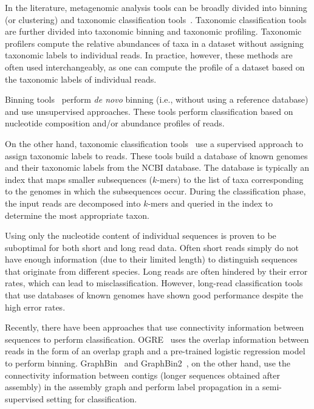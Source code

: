 In the literature, metagenomic analysis tools can be broadly divided into binning (or clustering) and taxonomic classification tools~\cite{simon2019benchmarking, maric2020benchmarking}. 
Taxonomic classification tools are further divided into taxonomic binning and taxonomic profiling. Taxonomic profilers compute the relative abundances of taxa in a dataset without assigning taxonomic labels to individual reads. In practice, however, these methods are often used interchangeably, as one can compute the profile of a dataset based on the taxonomic labels of individual reads.

Binning tools~\cite{balvert2019ogre, wickramarachchi2020metabcc, van2015two, alanko2017framework, cleary2015detection, girotto2016metaprob, luo2019metagenomic, alneberg2014binning, wu2016maxbin, sedlar2017bioinformatics, HerathTTAH17, kelley2010clustering, kang2019metabat, strous2012binning} perform \textit{de novo} binning (i.e., without using a reference database) and use unsupervised approaches. 
These tools perform classification based on nucleotide composition and/or abundance profiles of reads.

On the other hand, taxonomic classification tools~\cite{ames2013scalable, kim2016centrifuge, menzel2016fast, wood2014kraken, wood2019improved, dilthey2019strain,liu2018novel} use a supervised approach to assign taxonomic labels to reads.
These tools build a database of known genomes and their taxonomic labels from the NCBI database. 
The database is typically an index that maps smaller subsequences ($k$-mers) to the list of taxa corresponding to the genomes in which the subsequences occur. 
During the classification phase, the input reads are decomposed into $k$-mers and queried in the index to determine the most appropriate taxon.

Using only the nucleotide content of individual sequences is proven to be suboptimal for both short and long read data.
Often short reads simply do not have enough information (due to their limited length) to distinguish sequences that originate from different species.
Long reads are often hindered by their error rates, which can lead to misclassification.
However, long-read classification tools that use databases of known genomes have shown good performance despite the high error rates.

Recently, there have been approaches that use connectivity information between sequences to perform classification.
OGRE~\cite{balvert2019ogre} uses the overlap information between reads in the form of an overlap graph and a pre-trained logistic regression model to perform binning.
GraphBin~\cite{mallawaarachchi2020graphbin} and GraphBin2~\cite{mallawaarachchi2020graphbin2}, on the other hand, use the connectivity information between contigs (longer sequences obtained after assembly) in the assembly graph and perform label propagation in a semi-supervised setting for classification.

